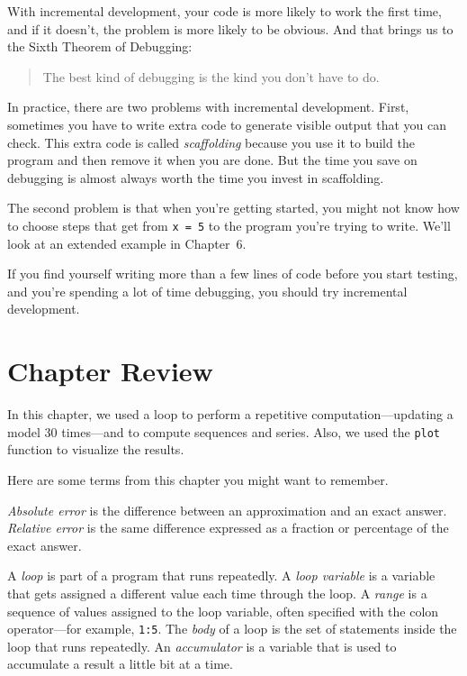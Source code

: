 
With incremental development, your code is more likely to work the first time, and if it doesn't, the problem is more likely to be obvious.  And that brings us to the Sixth Theorem of Debugging:

\begin{quote}
The best kind of debugging is the kind you don't have to do.
\end{quote}

In practice, there are two problems with incremental development.
First, sometimes you have to write extra code to
generate visible output that you can check.  This extra code is
called \emph{scaffolding} because you use it to build the program
and then remove it when you are done.  But the time you save on
debugging is almost always worth the time you invest in
scaffolding.

The second problem is that when you're getting started, you might not know how to
choose steps that get from \lstinline{x = 5} to the program you're trying
to write.  We'll look at an extended example in Chapter~6.

If you find yourself writing more than a few lines of code before
you start testing, and you're spending a lot of time debugging,
you should try incremental development.




\section{Chapter Review}

In this chapter, we used a loop to perform a repetitive computation---updating a model 30 times---and to compute sequences and series.  Also,  we used the \lstinline{plot} function to visualize the results.

Here are some terms from this chapter you might want to remember.

\emph{Absolute error} is the difference between an approximation and
an exact answer. \emph{Relative error} is the same difference expressed as a fraction or percentage of the exact answer.

A \emph{loop} is part of a program that runs repeatedly.
A \emph{loop variable} is a variable that gets assigned a different value each time through the loop.
A \emph{range} is a sequence of values assigned to the loop variable, often
specified with the colon operator---for example, \lstinline{1:5}.
The \emph{body} of a loop is the set of statements inside the loop that runs repeatedly.
An \emph{accumulator} is a variable that is used to accumulate a result a little bit at a time.

